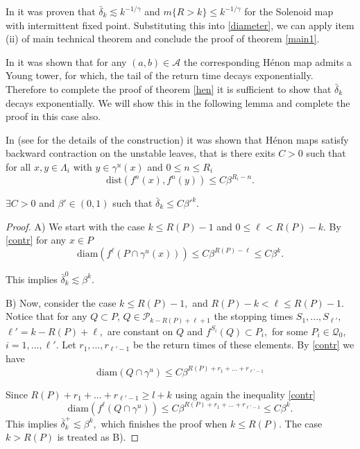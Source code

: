 \documentclass[a4paper,12pt]{amsart}
\numberwithin{equation}{section}
\begin{document}
In \cite{AlvPin} it was proven that $\bar\delta_k\lesssim
k^{-1/\gamma}$  and $m\{R>k\}\le k^{-1/\gamma}$ for the Solenoid map
with intermittent fixed point. Substituting this into
\eqref{diameter}, we can apply item (ii) of main technical theorem
and conclude the proof of theorem \ref{main1}.

In \cite{BY2} it was shown that for any $(a, b)\in\mathcal A$ the
corresponding H\'enon map admits a Young tower, for which, the tail
of the return time decays exponentially. Therefore to complete the
proof of theorem \ref{hen}  it is sufficient to show that
$\bar\delta_k$ decays exponentially. We will show this in the
following lemma and complete the proof in this case also.

In  \cite{Y1} (see \cite{BY2} for the details of the construction)
it was shown that H\'enon maps satisfy backward contraction on the
unstable leaves, that is there exits $C>0$ such that for all $x,
y\in \Lambda_i$ with $y\in\gamma^u(x)$ and $0\le n\le R_i$
\begin{equation}\label{contr} \text{dist}(f^n(x), f^n(y))\le C\beta^{R_i-n}. \end{equation}

\begin{lemma}
$\exists C>0$ and  $\beta'\in(0, 1)$ such that $\bar\delta_k\le
C\beta'^k.$
\end{lemma}

\begin{proof}

A) We start with the case $k\le R(P)-1$ and $0\le \ell< R(P)-k.$ By
\eqref{contr} for any $x\in P$
$$
\text{diam}(f^\ell(P\cap\gamma^u(x)))\le C\beta^{R(P)-\ell}\le
C\beta^k.$$

This implies $\bar\delta_k^0\lesssim \beta^k.$

B) Now, consider the case $k\le R(P)-1,$ and $R(P)-k< \ell \le
R(P)-1.$ Notice that for any $Q\subset P$, $Q\in\mathcal
P_{k-R(P)+\ell+1}$ the stopping times $S_1, ..., S_{\ell'},$
$\ell'=k-R(P)+\ell,$ are constant on $Q$ and $f^{S_i}(Q)\subset
P_i,$ for some $P_i\in\mathcal Q_0,$ $i=1, ..., \ell'.$ Let $r_1,
..., r_{\ell'-1}$ be the return times of these  elements. By
\eqref{contr} we have
$$
\text{diam}(Q\cap\gamma^u) \le C\beta^{R(P)+r_1+ ... +r_{\ell'-1}}
$$

Since $R(P)+r_1+...+r_{\ell'-1}\ge l+k$ using again the
inequality \eqref{contr}
$$\text{diam}(f^{\ell}(Q\cap\gamma^u))\le C\beta^{R(P)+r_1+ ... +r_{\ell'-1}}\le C\beta^k.$$
This implies $\bar\delta_k^+\lesssim \beta^k,$ which  finishes the proof when $k\le R(P).$ The
case $k>R(P)$ is treated as B).
\end{proof}
\end{document}
